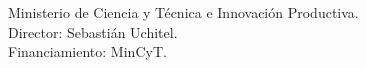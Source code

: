 \item[Agosto 2012 - Agosto 2014] Ministerio de Ciencia y T\'ecnica e Innovaci\'on Productiva.\\
    Director: Sebasti\'an Uchitel.\\
    Financiamiento: MinCyT.

